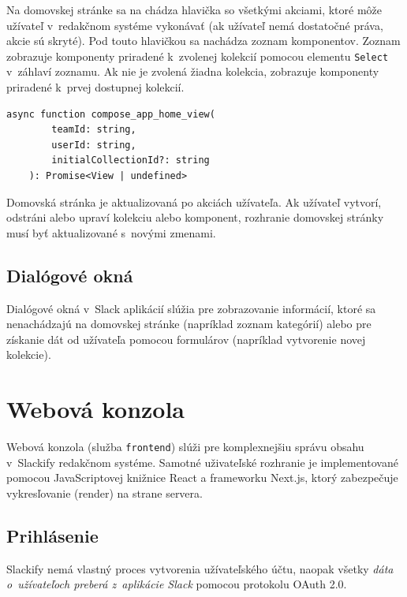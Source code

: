 
\noindent Na domovskej stránke sa na chádza hlavička so všetkými akciami, ktoré môže užívateľ v~redakčnom systéme vykonávať (ak užívateľ nemá dostatočné práva, akcie sú skryté). Pod touto hlavičkou sa nachádza zoznam komponentov. Zoznam zobrazuje komponenty priradené k~zvolenej kolekcií pomocou elementu \texttt{Select} v~záhlaví zoznamu. Ak nie je zvolená žiadna kolekcia, zobrazuje komponenty priradené k~prvej dostupnej kolekcií. \\

\begin{lstlisting}[caption={Funkcia zodpovedná za generovanie rozhrania domovskej stránky.}]
	async function compose_app_home_view(
		teamId: string,
		userId: string,
		initialCollectionId?: string
	): Promise<View | undefined>
\end{lstlisting}

\medskip

\noindent Domovská stránka je aktualizovaná po akciách užívateľa. Ak užívateľ vytvorí, odstráni alebo upraví kolekciu alebo komponent, rozhranie domovskej stránky musí byť aktualizované s~novými zmenami.

\subsection{Dialógové okná}
Dialógové okná v~Slack aplikácií slúžia pre zobrazovanie informácií, ktoré sa nenachádzajú na domovskej stránke (napríklad zoznam kategórií) alebo pre získanie dát od užívateľa pomocou formulárov (napríklad vytvorenie novej kolekcie).

\section{Webová konzola}
\label{impl:frontend}
Webová konzola (služba \texttt{frontend}) slúži pre komplexnejšiu správu obsahu v~Slackify redakčnom systéme. Samotné uživateľské rozhranie je implementované pomocou JavaScriptovej knižnice React a frameworku Next.js, ktorý zabezpečuje vykresľovanie (render) na strane servera.

\subsection{Prihlásenie}
Slackify nemá vlastný proces vytvorenia užívateľského účtu, naopak všetky \emph{dáta o~užívateľoch preberá z~aplikácie Slack} pomocou protokolu OAuth 2.0. \\

